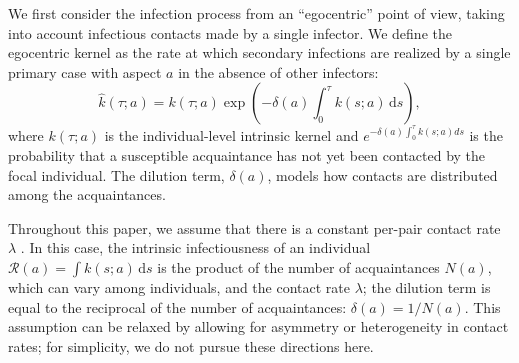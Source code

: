 \documentclass[12pt]{article}
\newcommand{\RR}{\ensuremath{{\mathcal R}}}
\begin{document}
We first consider the infection process from an ``egocentric'' point of view, taking into account infectious contacts made by a single infector.
We define the egocentric kernel as the rate at which secondary infections are realized by a single primary case with aspect $a$ in the absence of other infectors:
\begin{equation}
\hat{k}(\tau; a) = k(\tau; a) \exp \left(- \delta(a) \int_0^\tau k(s; a) \,\mathrm{d}s\right),
\end{equation}
where $k(\tau; a)$ is the individual-level intrinsic kernel and $e^{- \delta(a) \int_0^\tau k(s; a) ds}$ is the probability that a susceptible acquaintance has not yet been contacted by the focal individual.
The dilution term, $\delta(a)$, models how contacts are distributed among the acquaintances.

Throughout this paper, we assume that there is a constant per-pair contact rate $\lambda$ \cite{trapman2016inferring}.
In this case, the intrinsic infectiousness of an individual $\RR(a) = \int k(s; a) \,\mathrm{d}s$ is the product of the number of acquaintances $N(a)$, which can vary among individuals, and the contact rate $\lambda$; the dilution term is equal to the reciprocal of the number of acquaintances: $\delta(a) = 1/N(a)$.
This assumption can be relaxed by allowing for asymmetry \citep{trapman2016inferring} or heterogeneity \citep{ball1997epidemics, ball2002general} in contact rates; 
for simplicity, we do not pursue these directions here.
\end{document}
